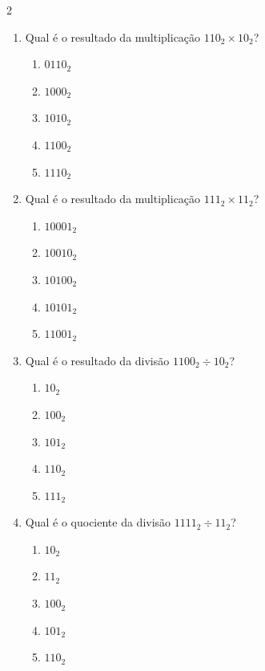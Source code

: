 \documentclass[a4paper,12pt]{article}
\begin{document}
\begin{multicols}{2}
\begin{enumerate}[leftmargin=*]
\vspace{0.2cm}


\item Qual é o resultado da multiplicação
$110_2 \times 10_2$?

\begin{enumerate}[label=(\Alph*)]
    \item $0110_2$
    \item $1000_2$
    \item $1010_2$
    \item $1100_2$
    \item $1110_2$
\end{enumerate}

\vspace{0.2cm}


\item Qual é o resultado da multiplicação
$111_2 \times 11_2$?

\begin{enumerate}[label=(\Alph*)]
    \item $10001_2$
    \item $10010_2$
    \item $10100_2$
    \item $10101_2$
    \item $11001_2$
\end{enumerate}

\vspace{0.2cm}



\item Qual é o resultado da divisão
$1100_2 \div 10_2$?

\begin{enumerate}[label=(\Alph*)]
    \item $10_2$
    \item $100_2$
    \item $101_2$
    \item $110_2$
    \item $111_2$
\end{enumerate}

\vspace{0.2cm}


\item Qual é o quociente da divisão
$1111_2 \div 11_2$?

\begin{enumerate}[label=(\Alph*)]
    \item $10_2$
    \item $11_2$
    \item $100_2$
    \item $101_2$
    \item $110_2$
\end{enumerate}


\end{enumerate}
\end{multicols}
\end{document}

